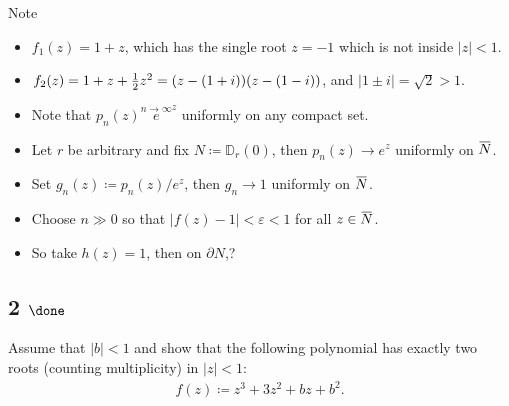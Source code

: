 \begin{solution}

\hfill

\begin{concept}

\hfill

\end{concept}

Note

\begin{itemize}
\item
  \(f_1(z) = 1+z\), which has the single root \(z=-1\) which is not
  inside \({\left\lvert {z} \right\rvert} < 1\).
\item
  \(f_2(z) = 1 + z + {1\over 2}z^2 = (z - (1+i))(z- (1-i))\), and
  \({\left\lvert {1\pm i} \right\rvert} = \sqrt 2 >1\).
\item
  Note that \(p_n(z) \overset{n\to\infty}e^z\) uniformly on any compact
  set.
\item
  Let \(r\) be arbitrary and fix \(N \coloneqq{\mathbb{D}}_r(0)\), then
  \(p_n(z) \to e^z\) uniformly on
  \(\mkern 1.5mu\overline{\mkern-1.5muN\mkern-1.5mu}\mkern 1.5mu\).
\item
  Set \(g_n(z) \coloneqq p_n(z) / e^z\), then \(g_n \to 1\) uniformly on
  \(\mkern 1.5mu\overline{\mkern-1.5muN\mkern-1.5mu}\mkern 1.5mu\).
\item
  Choose \(n\gg 0\) so that
  \({\left\lvert {f(z) - 1} \right\rvert} < \varepsilon< 1\) for all
  \(z\in \mkern 1.5mu\overline{\mkern-1.5muN\mkern-1.5mu}\mkern 1.5mu\).
\item
  So take \(h(z) = 1\), then on \({{\partial}}N\),?
\end{itemize}

\end{solution}

\hypertarget{done-9}{%
\subsection{\texorpdfstring{2
\(\done\)}{2 \textbackslash done}}\label{done-9}}

Assume that \({\left\lvert {b} \right\rvert} < 1\) and show that the
following polynomial has exactly two roots (counting multiplicity) in
\({\left\lvert {z} \right\rvert} < 1\):
\begin{align*}
f(z) \coloneqq z^3 + 3z^2 + bz + b^2
.\end{align*}


